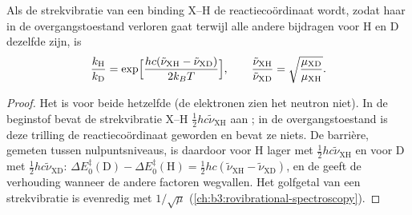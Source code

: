 \begin{proposition}\label{prop:b3:rate-theories:primary-kie}
Als de strekvibratie van een binding X--H de reactiecoördinaat wordt,
zodat haar  in de overgangstoestand verloren gaat terwijl
alle andere bijdragen voor H en D dezelfde zijn, is
\[
  \frac{k_{\mathrm H}}{k_{\mathrm D}} = \exp\Bigl[\frac{hc(\tilde\nu_{\mathrm{XH}} - \tilde\nu_{\mathrm{XD}})}{2k_BT}\Bigr],
  \qquad \frac{\tilde\nu_{\mathrm{XH}}}{\tilde\nu_{\mathrm{XD}}} = \sqrt{\frac{\mu_{\mathrm{XD}}}{\mu_{\mathrm{XH}}}} .
\]
\end{proposition}

\begin{proof}
Het  is voor beide  hetzelfde (de
elektronen zien het neutron niet). In de beginstof bevat de strekvibratie
X--H
$\frac12hc\tilde\nu_{\mathrm{XH}}$ aan ; in de
overgangstoestand is deze trilling de reactiecoördinaat geworden en bevat
ze niets. De barrière, gemeten tussen nulpuntsniveaus, is daardoor voor
H lager met $\frac12hc\tilde\nu_{\mathrm{XH}}$ en voor D met $\frac12hc\tilde\nu_{\mathrm{XD}}$: $\Delta E_0^{\ddagger}(\mathrm D) -
\Delta E_0^{\ddagger}(\mathrm H) = \frac12hc(\tilde\nu_{\mathrm{XH}} - \tilde\nu_{\mathrm{XD}})$, en de  geeft de
verhouding wanneer de andere factoren wegvallen. Het golfgetal van een
strekvibratie is evenredig met
$1/\sqrt\mu$ (\cref{ch:b3:rovibrational-spectroscopy}).
\end{proof}

